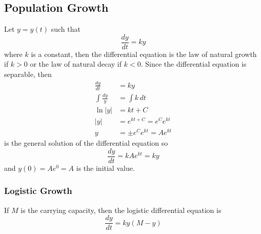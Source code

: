 \subsection{Population Growth}
Let \(y=y(t)\) such that
\[\frac{dy}{dt}=ky\]
where \(k\) is a constant, then the differential equation is the law of
natural growth if \(k>0\) or the law of natural decay if \(k<0\).
Since the differential equation is separable, then
\begin{align*}
    \frac{dy}{dt} &= ky \\
    \int\frac{dy}{y} &= \int k\,dt \\
    \ln|y| &= kt+C \\
    |y| &= e^{kt+C}=e^Ce^{kt} \\
    y &= \pm e^Ce^{kt}=Ae^{kt}
\end{align*}
is the general solution of the differential equation so
\[\frac{dy}{dt}=kAe^{kt}=ky\]
and \(y(0)=Ae^0=A\) is the initial value.

\subsubsection{Logistic Growth}
If \(M\) is the carrying capacity, then the logistic differential equation is
\[\frac{dy}{dt}=ky(M-y)\]
